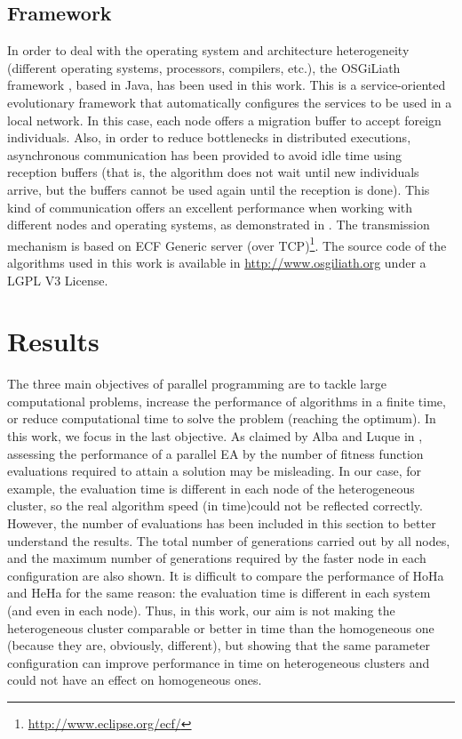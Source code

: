 \documentclass[final,1p,times]{elsarticle}
\begin{document}
\subsection{Framework}
In order to deal with the operating system and architecture heterogeneity (different operating systems, processors, compilers, etc.), the OSGiLiath framework \cite{SOASOCO}, based in Java, has been used in this work. This is a service-oriented evolutionary framework that automatically configures the services to be used in a local network. In this case, each node offers a migration buffer to accept foreign individuals. Also, in order to reduce bottlenecks in distributed executions, asynchronous communication has been provided to avoid idle time using reception buffers (that is, the algorithm does not wait until new individuals arrive, but the buffers cannot be used again until the reception is done). This kind of communication offers an excellent performance when working with different nodes and operating systems, as demonstrated in \cite{HETEROGENEOUSHARD,AsynchronousMerelo08}. The transmission mechanism is based on ECF Generic server (over TCP)\footnote{\url{http://www.eclipse.org/ecf/}}.  The source code of the algorithms used in this work is available in \url{http://www.osgiliath.org} under a LGPL V3 License. 


\section{Results}
\label{sec:results}



The three main objectives of parallel programming are to tackle large computational problems, increase the performance of algorithms in a finite time, or reduce computational time to solve the problem (reaching the optimum). In this work, we focus in the last objective.
As claimed by Alba and Luque in \cite{EVALUATIONPARALLEL}, assessing the performance of a parallel EA by the number of fitness function evaluations required to attain a solution may be misleading. In our case, for example, the evaluation time is different in each node of the heterogeneous cluster, so the real algorithm speed (in time)could not be reflected correctly. However, the number of evaluations has been included in this section to better understand the results. The total number of generations carried out by all nodes, and the maximum number of generations required by the faster node in each configuration are also shown. It is difficult to compare the performance of HoHa and HeHa for the same reason: the evaluation time is different in each system (and even in each node). Thus, in this work, our aim is not making the heterogeneous cluster comparable or better in time than the homogeneous one (because they are, obviously, different), but showing that the same parameter configuration can improve performance in time on heterogeneous clusters and could not have an effect on homogeneous ones.
\end{document}
